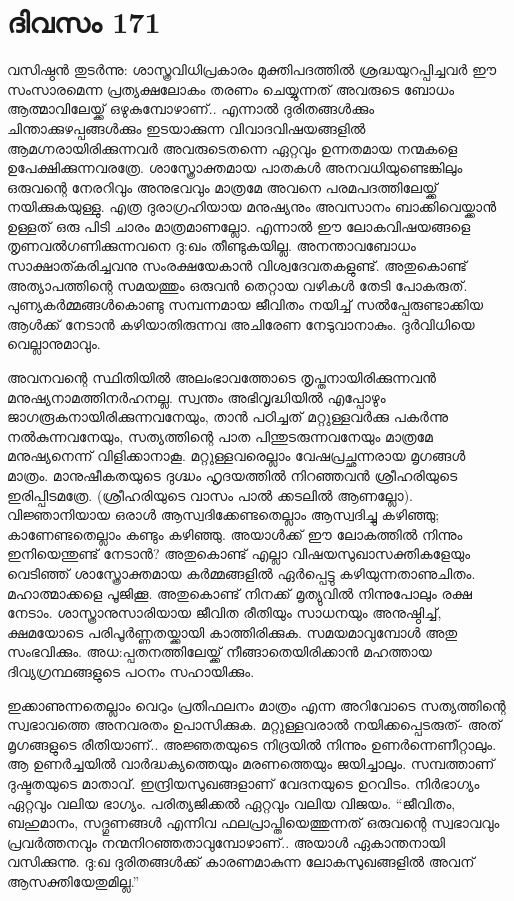 \section{ദിവസം 171}


വസിഷ്ഠൻ തുടർന്നു: ശാസ്ത്രവിധിപ്രകാരം മുക്തിപദത്തിൽ ശ്രദ്ധയുറപ്പിച്ചവർ ഈ സംസാരമെന്ന പ്രത്യക്ഷലോകം തരണം ചെയ്യുന്നത് അവരുടെ ബോധം ആത്മാവിലേയ്ക്ക് ഒഴുകുമ്പോഴാണ്‌.. എന്നാൽ ദുരിതങ്ങൾക്കും ചിന്താക്കുഴപ്പങ്ങൾക്കും ഇടയാക്കുന്ന വിവാദവിഷയങ്ങളിൽ ആമഗ്നരായിരിക്കുന്നവർ അവരുടെതന്നെ ഏറ്റവും ഉന്നതമായ നന്മകളെ ഉപേക്ഷിക്കുന്നവരത്രേ. ശാസ്ത്രോക്തമായ പാതകൾ അനവധിയുണ്ടെങ്കിലും ഒരുവന്റെ നേരറിവും അനുഭവവും മാത്രമേ അവനെ പരമപദത്തിലേയ്ക്ക് നയിക്കുകയുള്ളു. എത്ര ദുരാഗ്രഹിയായ മനുഷ്യനും അവസാനം ബാക്കിവെയ്ക്കാൻ ഉള്ളത് ഒരു പിടി ചാരം മാത്രമാണല്ലോ. എന്നാൽ ഈ ലോകവിഷയങ്ങളെ തൃണവൽഗണിക്കുന്നവനെ ദു:ഖം തീണ്ടുകയില്ല. അനന്താവബോധം സാക്ഷാത്കരിച്ചവനു സംരക്ഷയേകാൻ വിശ്വദേവതകളുണ്ട്. അതുകൊണ്ട് അത്യാപത്തിന്റെ സമയത്തും ഒരുവൻ തെറ്റായ വഴികൾ തേടി പോകരുത്. പുണ്യകർമ്മങ്ങൾകൊണ്ടു സമ്പന്നമായ ജീവിതം നയിച്ച് സൽപ്പേരുണ്ടാക്കിയ ആൾക്ക് നേടാൻ കഴിയാതിരുന്നവ അചിരേണ നേടുവാനാകും. ദുർവിധിയെ വെല്ലാനുമാവും.

അവനവന്റെ സ്ഥിതിയിൽ അലംഭാവത്തോടെ തൃപ്തനായിരിക്കുന്നവൻ മനുഷ്യനാമത്തിനർഹനല്ല. സ്വന്തം അഭിവൃദ്ധിയിൽ എപ്പോഴും ജാഗരൂകനായിരിക്കുന്നവനേയും, താൻ പഠിച്ചത് മറ്റുള്ളവർക്കു പകർന്നു നൽകുന്നവനേയും, സത്യത്തിന്റെ പാത പിന്തുടരുന്നവനേയും മാത്രമേ മനുഷ്യനെന്ന് വിളിക്കാനാകൂ. മറ്റുള്ളവരെല്ലാം വേഷപ്രച്ഛന്നരായ മൃഗങ്ങൾ മാത്രം. മാനുഷീകതയുടെ ദുഗ്ദ്ധം ഹൃദയത്തിൽ നിറഞ്ഞവൻ ശ്രീഹരിയുടെ ഇരിപ്പിടമത്രേ. (ശ്രീഹരിയുടെ വാസം പാൽ ക്കടലിൽ ആണല്ലോ). വിജ്ഞാനിയായ ഒരാൾ ആസ്വദിക്കേണ്ടതെല്ലാം ആസ്വദിച്ചു കഴിഞ്ഞു; കാണേണ്ടതെല്ലാം കണ്ടും കഴിഞ്ഞു. അയാൾക്ക് ഈ ലോകത്തിൽ നിന്നും ഇനിയെന്തുണ്ട് നേടാൻ? അതുകൊണ്ട് എല്ലാ വിഷയസുഖാസക്തികളേയും വെടിഞ്ഞ് ശാസ്ത്രോക്തമായ കർമ്മങ്ങളിൽ ഏർപ്പെട്ടു കഴിയുന്നതാണുചിതം. മഹാത്മാക്കളെ പൂജിക്കൂ. അതുകൊണ്ട് നിനക്ക് മൃത്യുവിൽ നിന്നുപോലും രക്ഷ നേടാം. ശാസ്ത്രാനുസാരിയായ ജീവിത രീതിയും സാധനയും അനുഷ്ഠിച്ച്, ക്ഷമയോടെ പരിപൂർണ്ണതയ്ക്കായി കാത്തിരിക്കുക. സമയമാവുമ്പോൾ അതു സംഭവിക്കും. അധ:പ്പതനത്തിലേയ്ക്ക് നീങ്ങാതെയിരിക്കാൻ മഹത്തായ ദിവ്യഗ്രന്ഥങ്ങളുടെ പഠനം സഹായിക്കും.

ഇക്കാണുന്നതെല്ലാം വെറും പ്രതിഫലനം മാത്രം എന്ന അറിവോടെ സത്യത്തിന്റെ സ്വഭാവത്തെ അനവരതം ഉപാസിക്കുക. മറ്റുള്ളവരാൽ നയിക്കപ്പെടരുത്- അത് മൃഗങ്ങളുടെ രീതിയാണ്‌..  അജ്ഞതയുടെ നിദ്രയിൽ നിന്നും ഉണർന്നെണീറ്റാലും. ആ ഉണർച്ചയിൽ വാർദ്ധക്യത്തെയും മരണത്തെയും ജയിച്ചാലും. സമ്പത്താണ്‌ ദുഷ്ടതയുടെ മാതാവ്. ഇന്ദ്രിയസുഖങ്ങളാണ്‌ വേദനയുടെ ഉറവിടം. നിർഭാഗ്യം ഏറ്റവും വലിയ ഭാഗ്യം. പരിത്യജിക്കൽ ഏറ്റവും വലിയ വിജയം. “ജീവിതം, ബഹുമാനം, സദ്ഗുണങ്ങൾ എന്നിവ ഫലപ്രാപ്തിയെത്തുന്നത് ഒരുവന്റെ സ്വഭാവവും പ്രവർത്തനവും നന്മനിറഞ്ഞതാവുമ്പോഴാണ്‌..  അയാള്‍ ഏകാന്തനായി വസിക്കുന്നു. ദു:ഖ ദുരിതങ്ങൾക്ക് കാരണമാകുന്ന ലോകസുഖങ്ങളിൽ അവന്‌ ആസക്തിയേതുമില്ല.” 

